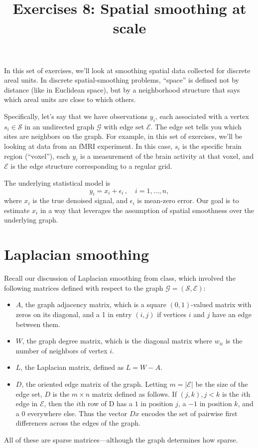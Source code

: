 \documentclass{mynotes}
\title[Exercises 8 $\cdot$ SDS 385]{Exercises 8: Spatial smoothing at scale}
\date{}  %
\begin{document}
\maketitle%

\bigskip


In this set of exercises, we'll look at smoothing spatial data collected for discrete areal units.  In discrete spatial-smoothing problems, ``space'' is defined not by distance (like in Euclidean space), but by a neighborhood structure that says which areal units are close to which others.

Specifically, let's say that we have observations $y_i$, each associated with a vertex $s_i \in \mathcal{S}$ in an undirected graph $\mathcal{G}$ with edge set $\mathcal{E}$.  The edge set tells you which sites are neighbors on the graph.  For example, in this set of exercises, we'll be looking at data from an fMRI experiment.  In this case, $s_i$ is the specific brain region (``voxel''), each $y_i$ is a measurement of the brain activity at that voxel, and $\mathcal{E}$ is the edge structure corresponding to a regular grid.

The underlying statistical model is
$$
y_i = x_i + \epsilon_i \, , \quad i = 1, \ldots, n, 
$$
where $x_i$ is the true denoised signal, and $\epsilon_i$ is mean-zero error.  Our goal is to estimate $x_i$ in a way that leverages the assumption of spatial smoothness over the underlying graph.

\section{Laplacian smoothing}

Recall our discussion of Laplacian smoothing from class, which involved the following matrices defined with respect to the graph $\mathcal{G} = (\mathcal{S}, \mathcal{E})$:
\begin{itemize}
\item $A$, the graph adjacency matrix, which is a square $(0,1)$-valued matrix with zeros on its diagonal, and a 1 in entry $(i,j)$ if vertices $i$ and $j$ have an edge between them.
\item $W$, the graph degree matrix, which is the diagonal matrix where $w_{ii}$ is the number of neighbors of vertex $i$.
\item $L$, the Laplacian matrix, defined as $L = W - A$.
\item $D$, the oriented edge matrix of the graph.   Letting $m = |\mathcal{E}|$ be the size of the edge set, $D$ is the $m \times n$ matrix defined as follows.  If $(j,k), j<k$ is the $i$th edge in $\mathcal{E}$, then the $i$th row of D has a $1$ in position $j$, a $-1$ in position $k$, and a $0$ everywhere else.  Thus the vector $D x$ encodes the set of pairwise first differences across the edges of the graph.
\end{itemize}
All of these are sparse matrices---although the graph determines how sparse.
\end{document}
